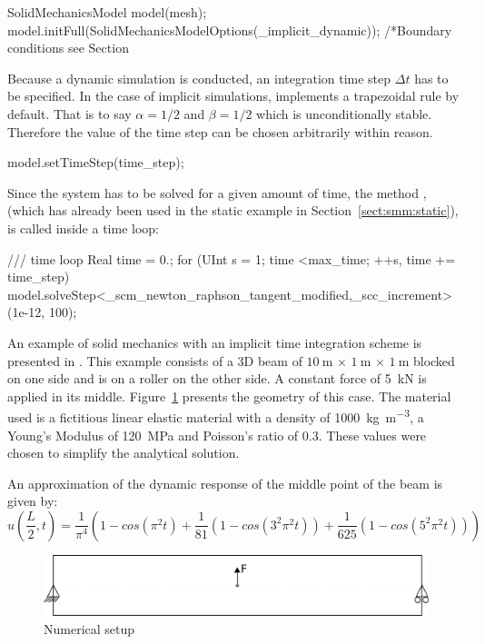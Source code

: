 \begin{cpp}
SolidMechanicsModel model(mesh);
model.initFull(SolidMechanicsModelOptions(_implicit_dynamic));
/*Boundary conditions see Section~%
\end{cpp}
Because a dynamic simulation is conducted, an integration time step
$\Delta t$ has to be specified. In the case of implicit simulations,
\akantu implements a trapezoidal rule by default.  That is to say
$\alpha = 1/2$ and $\beta = 1/2$ which is unconditionally
stable. Therefore the value of the time step can be chosen arbitrarily
within reason.  
\begin{cpp}
model.setTimeStep(time_step);
\end{cpp}
Since the system has to be solved for a given amount of time, the
method , (which has already been used in the static
example in Section~\ref{sect:smm:static}), is called inside a time
loop:
\begin{cpp}
/// time loop
Real time = 0.;
for (UInt s = 1; time <max_time; ++s, time += time_step) {
  model.solveStep<_scm_newton_raphson_tangent_modified,_scc_increment>(1e-12, 100);
}
\end{cpp}
An example of solid mechanics with an implicit time integration scheme
is presented in
.  This example
consists of a 3D beam of
$\SI{10}{\metre}\,\times\,\SI{1}{\metre}\,\times\,\SI{1}{\metre}$
blocked on one side and is on a roller on the other side.  A constant
force of \SI{5}{\kilo\newton} is applied in its middle.
Figure~\ref{fig:smm:implicit:dynamic} presents the geometry of this
case. The material used is a fictitious linear elastic material with a
density of \SI{1000}{\kilo\gram\per\cubic\metre}, a Young's Modulus of
\SI{120}{\mega\pascal} and Poisson's ratio of $0.3$. These values
were chosen to simplify the analytical solution.

An approximation of the dynamic response of the middle point of the
beam is given by:
\begin{equation}
  \label{eqn:smm:implicit}
  u\left(\frac{L}{2}, t\right)
  = \frac{1}{\pi^4} \left(1 - cos\left(\pi^2 t\right) +
    \frac{1}{81}\left(1 - cos\left(3^2 \pi^2 t\right)\right) +
    \frac{1}{625}\left(1 - cos\left(5^2 \pi^2 t\right)\right)\right)
\end{equation}

\begin{figure}[!htb]
  \centering
  \includegraphics[scale=.6]{figures/implicit_dynamic}
  \caption{Numerical setup}
  \label{fig:smm:implicit:dynamic}
\end{figure}

